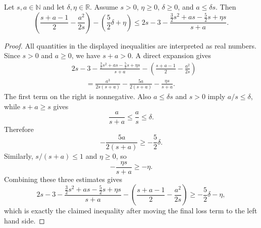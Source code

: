 \begin{helper}
Let \(s,a\in\mathbb N\) and let \(\delta,\eta\in\mathbb R\).  Assume
\(s>0\), \(\eta\ge0\), \(\delta\ge0\), and \(a\le\delta s\).  Then
\[
  \left(\frac{s+a-1}{2}-\frac{a^2}{2s}\right)
    -\left(\frac52\delta+\eta\right)
  \le
  2s-3-
  \frac{\frac32s^2+as-\frac52s+\eta s}{s+a}.
\]
\end{helper}
\begin{proof}
All quantities in the displayed inequalities are interpreted as real numbers.
Since \(s>0\) and \(a\ge0\), we have \(s+a>0\).  A direct expansion gives
\[
\begin{aligned}
&2s-3-
  \frac{\frac32s^2+as-\frac52s+\eta s}{s+a}
  -\left(\frac{s+a-1}{2}-\frac{a^2}{2s}\right)\\
&\qquad =
  \frac{a^3}{2s(s+a)}
  -\frac{5a}{2(s+a)}
  -\frac{\eta s}{s+a}.
\end{aligned}
\]
The first term on the right is nonnegative.  Also \(a\le\delta s\) and
\(s>0\) imply \(a/s\le\delta\), while \(s+a\ge s\) gives
\[
  \frac{a}{s+a}\le \frac{a}{s}\le\delta.
\]
Therefore
\[
  -\frac{5a}{2(s+a)}\ge -\frac52\delta.
\]
Similarly, \(s/(s+a)\le1\) and \(\eta\ge0\), so
\[
  -\frac{\eta s}{s+a}\ge-\eta.
\]
Combining these three estimates gives
\[
  2s-3-
  \frac{\frac32s^2+as-\frac52s+\eta s}{s+a}
  -\left(\frac{s+a-1}{2}-\frac{a^2}{2s}\right)
  \ge -\frac52\delta-\eta,
\]
which is exactly the claimed inequality after moving the final loss term to
the left hand side.
\end{proof}
